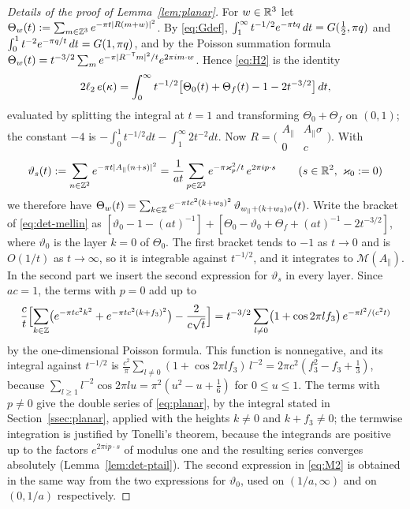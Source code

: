 \begin{proof}[Details of the proof of Lemma~\ref{lem:planar}]
For $w\in\mathbb R^3$ let $\Theta_w(t):=\sum_{m\in\mathbb Z^3}e^{-\pi t|R(m+w)|^2}$. By \eqref{eq:Gdef},
$\int_1^\infty t^{-1/2}e^{-\pi tq}\,dt=G(\frac12,\pi q)$ and $\int_0^1t^{-2}e^{-\pi q/t}\,dt=G(1,\pi q)$, and by the Poisson
summation formula $\Theta_w(t)=t^{-3/2}\sum_me^{-\pi|R^{-\mathsf T}m|^2/t}e^{2\pi im\cdot w}$. Hence \eqref{eq:H2} is the identity
\begin{equation}\label{eq:det-mellin}
  2\ell_2\,e(\kappa)=\int_0^\infty t^{-1/2}\bigl[\Theta_0(t)+\Theta_f(t)-1-2t^{-3/2}\bigr]\,dt ,
\end{equation}
evaluated by splitting the integral at $t=1$ and transforming $\Theta_0+\Theta_f$ on $(0,1)$; the constant $-4$ is
$-\int_0^1t^{-1/2}dt-\int_1^\infty2t^{-2}dt$. Now $R=\bigl(\begin{smallmatrix}A_\parallel&A_\parallel\sigma\\0&c\end{smallmatrix}\bigr)$.
With
\[
  \vartheta_s(t):=\sum_{n\in\mathbb Z^2}e^{-\pi t|A_\parallel(n+s)|^2}=\frac1{at}\sum_{p\in\mathbb Z^2}e^{-\pi\varkappa_p^2/t}\,e^{2\pi ip\cdot s}\qquad(s\in\mathbb R^2,\ \varkappa_0:=0)
\]
we therefore have $\Theta_w(t)=\sum_{k\in\mathbb Z}e^{-\pi tc^2(k+w_3)^2}\,\vartheta_{w_\parallel+(k+w_3)\sigma}(t)$. Write the bracket of
\eqref{eq:det-mellin} as $[\vartheta_0-1-(at)^{-1}]+[\Theta_0-\vartheta_0+\Theta_f+(at)^{-1}-2t^{-3/2}]$, where $\vartheta_0$ is the
layer $k=0$ of $\Theta_0$. The first bracket tends to $-1$ as $t\to0$ and is $O(1/t)$ as $t\to\infty$, so it is integrable against
$t^{-1/2}$, and it integrates to $\mathcal M(A_\parallel)$. In the second part we insert the second expression
for $\vartheta_s$ in every layer. Since $ac=1$, the terms with $p=0$ add up to
\[
  \frac ct\Bigl[\sum_{k\in\mathbb Z}\bigl(e^{-\pi tc^2k^2}+e^{-\pi tc^2(k+f_3)^2}\bigr)-\frac2{c\sqrt t}\Bigr]
  =t^{-3/2}\sum_{l\ne0}\bigl(1+\cos2\pi lf_3\bigr)\,e^{-\pi l^2/(c^2t)}
\]
by the one-dimensional Poisson formula. This function is nonnegative, and its integral against $t^{-1/2}$ is
$\frac{c^2}\pi\sum_{l\ne0}(1+\cos2\pi lf_3)\,l^{-2}=2\pi c^2(f_3^2-f_3+\frac13)$, because
$\sum_{l\ge1}l^{-2}\cos2\pi lu=\pi^2(u^2-u+\frac16)$ for $0\le u\le1$. The terms with $p\ne0$ give the double series of
\eqref{eq:planar}, by the integral stated in Section~\ref{ssec:planar}, applied with the heights $k\ne0$ and $k+f_3\ne0$; the
termwise integration is justified by Tonelli's theorem, because the integrands are positive up to the factors $e^{2\pi ip\cdot s}$
of modulus one and the resulting series converges absolutely (Lemma~\ref{lem:det-ptail}). The second expression
in \eqref{eq:M2} is obtained in the same way from the two expressions for $\vartheta_0$, used on $(1/a,\infty)$ and on $(0,1/a)$
respectively.
\end{proof}

